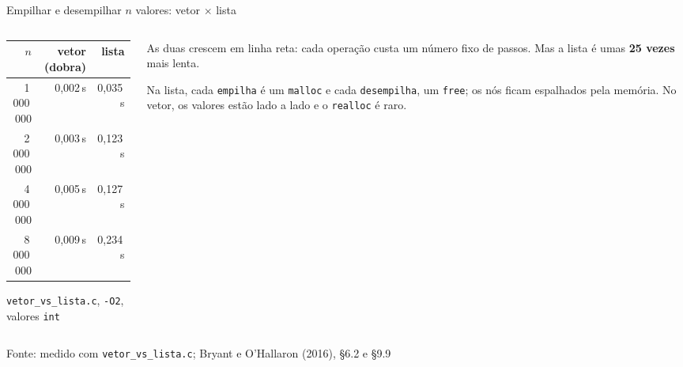 \documentclass[aspectratio=169]{beamer}
\newcommand{\fonte}[1]{\vfill\hfill{\scriptsize\textcolor{UFSGray}{Fonte: #1}}}
\begin{document}
\begin{frame}{Empilhar e desempilhar $n$ valores: vetor $\times$ lista}
  \begin{columns}[c]
    \begin{column}{0.48\textwidth}
      \begin{center}
      \small
      \begin{tabular}{@{}rrr@{}}
        \toprule
        $n$ & vetor (dobra) & lista\\
        \midrule
        1\,000\,000 & 0,002\,s & 0,035\,s\\
        2\,000\,000 & 0,003\,s & 0,123\,s\\
        4\,000\,000 & 0,005\,s & 0,127\,s\\
        8\,000\,000 & 0,009\,s & 0,234\,s\\
        \bottomrule
      \end{tabular}

      \medskip
      \scriptsize \texttt{vetor\_vs\_lista.c}, \texttt{-O2}, valores
      \texttt{int}
      \end{center}
    \end{column}
    \begin{column}{0.48\textwidth}
      \small
      As duas crescem em linha reta: cada operação custa um número fixo de
      passos. Mas a lista é umas \textbf{25 vezes} mais lenta.

      \medskip
      Na lista, cada \texttt{empilha} é um \texttt{malloc} e cada
      \texttt{desempilha}, um \texttt{free}; os nós ficam espalhados pela
      memória. No vetor, os valores estão lado a lado e o
      \texttt{realloc} é raro.
    \end{column}
  \end{columns}
  \fonte{medido com \texttt{vetor\_vs\_lista.c};
    Bryant e O'Hallaron (2016), §6.2 e §9.9~\cite{bryant2016computer}}
\end{frame}
\end{document}
